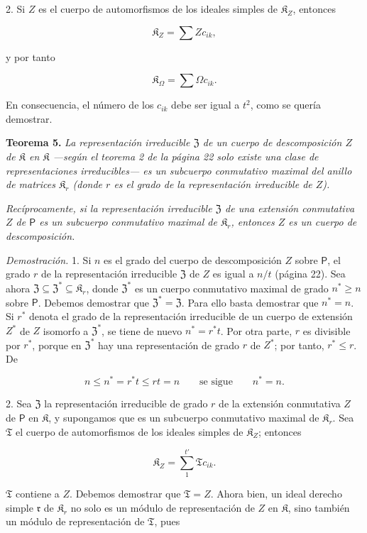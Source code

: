 2. Si \(Z\) es el cuerpo de automorfismos de los ideales simples de \(\mathfrak K_Z\), entonces

\[
\mathfrak K_Z=\sum Zc_{ik},
\]

y por tanto

\[
\mathfrak K_\Omega=\sum\Omega c_{ik}.
\]

En consecuencia, el número de los \(c_{ik}\) debe ser igual a \(t^2\), como se quería demostrar.

\textbf{Teorema 5.} \emph{La representación irreducible \(\mathfrak Z\) de un cuerpo de descomposición \(Z\) de \(\mathfrak K\) en \(\mathfrak K\) ---según el teorema 2 de la página 22 solo existe una clase de representaciones irreducibles--- es un subcuerpo conmutativo maximal del anillo de matrices \(\mathfrak K_r\) (donde \(r\) es el grado de la representación irreducible de \(Z\)).}

\emph{Recíprocamente, si la representación irreducible \(\mathfrak Z\) de una extensión conmutativa \(Z\) de \(\mathsf P\) es un subcuerpo conmutativo maximal de \(\mathfrak K_r\), entonces \(Z\) es un cuerpo de descomposición.}

\emph{Demostración.} 1. Si \(n\) es el grado del cuerpo de descomposición \(Z\) sobre \(\mathsf P\), el grado \(r\) de la representación irreducible \(\mathfrak Z\) de \(Z\) es igual a \(n/t\) (página 22). Sea ahora \(\mathfrak Z\subseteq\mathfrak Z^*\subseteq\mathfrak K_r\), donde \(\mathfrak Z^*\) es un cuerpo conmutativo maximal de grado \(n^*\geq n\) sobre \(\mathsf P\). Debemos demostrar que \(\mathfrak Z^*=\mathfrak Z\). Para ello basta demostrar que \(n^*=n\). Si \(r^*\) denota el grado de la representación irreducible de un cuerpo de extensión \(Z^*\) de \(Z\) isomorfo a \(\mathfrak Z^*\), se tiene de nuevo \(n^*=r^*t\). Por otra parte, \(r\) es divisible por \(r^*\), porque en \(\mathfrak Z^*\) hay una representación de grado \(r\) de \(Z^*\); por tanto, \(r^*\leq r\). De

\[
n\leq n^*=r^*t\leq rt=n \qquad\text{se sigue}\qquad n^*=n.
\]

2. Sea \(\mathfrak Z\) la representación irreducible de grado \(r\) de la extensión conmutativa \(Z\) de \(\mathsf P\) en \(\mathfrak K\), y supongamos que es un subcuerpo conmutativo maximal de \(\mathfrak K_r\). Sea \(\mathfrak T\) el cuerpo de automorfismos de los ideales simples de \(\mathfrak K_Z\); entonces

\[
\mathfrak K_Z=\sum_{1}^{t'}\mathfrak T c_{ik}.
\]

\(\mathfrak T\) contiene a \(Z\). Debemos demostrar que \(\mathfrak T=Z\). Ahora bien, un ideal derecho simple \(\mathfrak r\) de \(\mathfrak K_r\) no solo es un módulo de representación de \(Z\) en \(\mathfrak K\), sino también un módulo de representación de \(\mathfrak T\), pues

